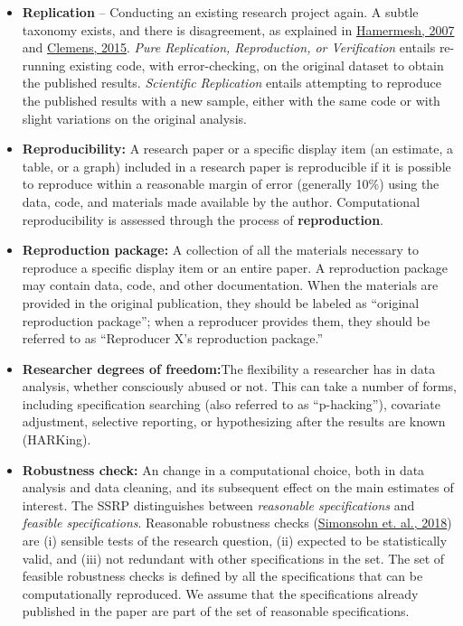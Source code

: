 \documentclass[
]{book}
\begin{document}
\begin{itemize}
\item
  \textbf{Replication} -- Conducting an existing research project again. A subtle taxonomy exists, and there is disagreement, as explained in \href{https://poseidon01.ssrn.com/delivery.php?ID=730022068104120012124069127117116094125005035067064043105083109027064120011088086109059117052062000025007012029080123125089014014006079063116014095000023071022077006017094093005117096083119073115079022110105075073085121117103030106102080005099007\&EXT=pdf}{Hamermesh, 2007} and \href{https://www.cgdev.org/sites/default/files/CGD-Working-Paper-399-Clemens-Meaning-Failed-Replications.pdf}{Clemens, 2015}. \emph{Pure Replication, Reproduction, or Verification} entails re-running existing code, with error-checking, on the original dataset to obtain the published results. \emph{Scientific Replication} entails attempting to reproduce the published results with a new sample, either with the same code or with slight variations on the original analysis.
\item
  \textbf{Reproducibility:} A research paper or a specific display item (an estimate, a table, or a graph) included in a research paper is reproducible if it is possible to reproduce within a reasonable margin of error (generally 10\%) using the data, code, and materials made available by the author. Computational reproducibility is assessed through the process of \textbf{reproduction}.
\item
  \textbf{Reproduction package:} A collection of all the materials necessary to reproduce a specific display item or an entire paper. A reproduction package may contain data, code, and other documentation. When the materials are provided in the original publication, they should be labeled as ``original reproduction package''; when a reproducer provides them, they should be referred to as ``Reproducer X's reproduction package.''\\
\item
  \textbf{Researcher degrees of freedom:}The flexibility a researcher has in data analysis, whether consciously abused or not. This can take a number of forms, including specification searching (also referred to as ``p-hacking''), covariate adjustment, selective reporting, or hypothesizing after the results are known (HARKing).
\item
  \textbf{Robustness check:} An change in a computational choice, both in data analysis and data cleaning, and its subsequent effect on the main estimates of interest. The SSRP distinguishes between \emph{reasonable specifications} and \emph{feasible specifications}. Reasonable robustness checks (\href{https://urisohn.com/sohn_files/wp/wordpress/wp-content/uploads/Paper-Specification-curve-2018-11-02.pdf}{Simonsohn et. al., 2018}) are (i) sensible tests of the research question, (ii) expected to be statistically valid, and (iii) not redundant with other specifications in the set. The set of feasible robustness checks is defined by all the specifications that can be computationally reproduced. We assume that the specifications already published in the paper are part of the set of reasonable specifications.

\end{itemize}
\end{document}

